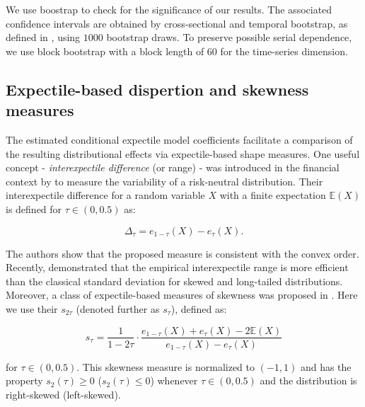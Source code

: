 \documentclass[11pt]{article}
\begin{document}
We use boostrap to check for the significance of our results. The associated confidence intervals are obtained by cross-sectional and temporal bootstrap, as defined in \cite{Kapetanios2008}, using \(1000\) bootstrap draws. To preserve possible serial dependence, we use block bootstrap with a block length of \(60\) for the time-series dimension.

\hypertarget{expectile-based-dispertion-and-skewness-measures}{%
\subsection{Expectile-based dispertion and skewness measures}\label{expectile-based-dispertion-and-skewness-measures}}

The estimated conditional expectile model coefficients facilitate a comparison of the resulting distributional effects via expectile-based shape measures. One useful concept - \emph{interexpectile difference} (or range) - was introduced in the financial context by \cite{bellini2018} to measure the variability of a risk-neutral distribution. Their interexpectile difference for a random variable \(X\) with a finite expectation \(\mathbb E(X)\) is defined for \(\tau\in(0,0.5)\) as:

\[\Delta_\tau = e_{1-\tau}(X) - e_\tau(X).\]


The authors show that the proposed measure is consistent with the convex order. Recently, \cite{eberl2022} demonstrated that the empirical interexpectile range is more efficient than the classical standard deviation for skewed and long-tailed distributions. Moreover, a class of expectile-based measures of skewness was proposed in \cite{eberl2022sk}. Here we use their \(s_{2\tau}\) (denoted further as \(s_\tau\)), defined as:

\[s_{\tau} = \frac 1{1-2\tau}\cdot\frac{e_{1-\tau}(X) + e_\tau(X) - 2\mathbb E(X)}{e_{1-\tau}(X) - e_\tau(X)}\]

for \(\tau\in(0,0.5).\) This skewness measure is normalized to \((-1,1)\) and has the property \(s_2(\tau)\geq 0\) (\(s_2(\tau)\leq 0\)) whenever \(\tau\in(0,0.5)\) and the distribution is right-skewed (left-skewed).
\end{document}
